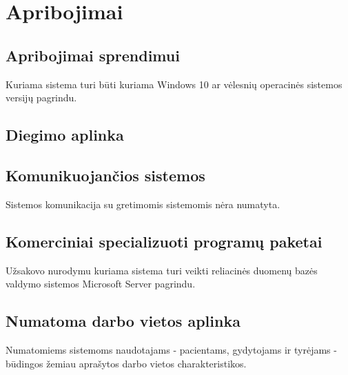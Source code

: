 \documentclass[12pt]{article}
\begin{document}
\newpage

\section{Apribojimai}
\subsection{Apribojimai sprendimui}
Kuriama sistema turi būti kuriama Windows 10 ar vėlesnių operacinės sistemos
versijų pagrindu.

\subsection{Diegimo aplinka}

\subsection{Komunikuojančios sistemos}
Sistemos komunikacija su gretimomis sistemomis nėra numatyta.

\subsection{Komerciniai specializuoti programų paketai}
Užsakovo nurodymu kuriama sistema turi veikti reliacinės duomenų bazės valdymo
sistemos Microsoft Server pagrindu.

\newpage

\subsection{Numatoma darbo vietos aplinka}
Numatomiems sistemoms naudotajams - pacientams, gydytojams ir tyrėjams -
būdingos žemiau aprašytos darbo vietos charakteristikos.
\end{document}
